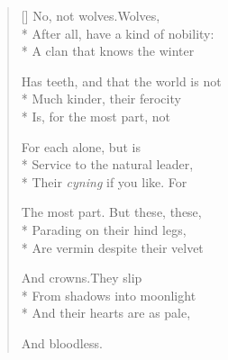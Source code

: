 \label{ch:lear_au}
\settowidth{\versewidth}{Has teeth, and that the world is not}
\begin{verse}[\versewidth]
 No, not wolves.\quad Wolves,\\*
After all, have a kind of nobility:\\*
A clan that knows the winter

Has teeth, and that the world is not\\*
Much kinder, their ferocity\\*
Is, for the most part, not

For each alone, but is\\*
Service to the natural leader,\\*
Their \textit{cyning} if you like. For

The most part.  But these, these,\\*
Parading on their hind legs,\\*
Are vermin despite their velvet

And crowns.\qquad They slip\\*
From shadows into moonlight\\*
And their hearts are as pale,

And bloodless.
\end{verse}
